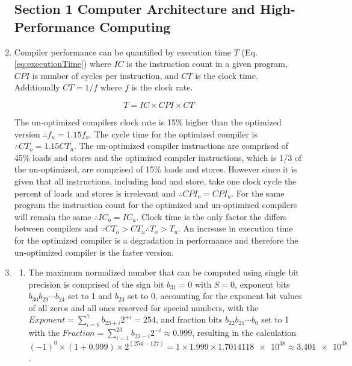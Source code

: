 \documentclass[main.tex]{subfiles}
\begin{document}
\begin{enumerate}

\subsection{Section 1 Computer Architecture and High-Performance Computing}

\item Compiler performance can be quantified by execution time $T$ (Eq. \ref{eq:executionTime}) where $IC$ is the instruction count in a given program, $CPI$ is number of cycles per instruction, and $CT$ is the clock time. Additionally $CT=1/f$ where $f$ is the clock rate.

\begin{equation} \label{eq:executionTime}
T = IC \times CPI \times CT
\end{equation}

The un-optimized compilers clock rate is 15\% higher than the optimized version $\therefore f_{u} = 1.15f_{o}$. The cycle time for the optimized compiler is $\therefore CT_o = 1.15CT_u$. The un-optimized compiler instructions are comprised of 45\% loads and stores and the optimized compiler instructions, which is 1/3 of the un-optimized, are comprised of 15\% loads and stores. However since it is given that all instructions, including load and store, take one clock cycle the percent of loads and stores is irrelevant and $\therefore CPI_o = CPI_u$. For the same program the instruction count for the optimized and un-optimized compilers will remain the same $\therefore IC_o = IC_u$. Clock time is the only factor the differs between compilers and $\because CT_o > CT_u \therefore T_o > T_u$. An increase in execution time for the optimized compiler is a degradation in performance and therefore the un-optimized compiler is the faster version.

\item 
\begin{enumerate}
    \item The maximum normalized number that can be computed using single bit precision is comprised of the sign bit $b_{31} = 0$ with $S=0$, exponent bits $b_{30} b_{29} \cdots b_{24}$ set to 1 and $b_{23}$ set to 0, accounting for the exponent bit values of all zeros and all ones reserved for special numbers, with the $Exponent = \sum_{i=0}^{7} b_{23+i} 2^{+i} = 254$, and fraction bits $b_{22} b_{21} \cdots b_{0}$ set to 1 with the $Fraction = \sum_{i=1}^{23} b_{23-i} 2^{-i} \approx 0.999$, resulting in the calculation $(-1)^0 \times (1+0.999) \times 2^{(254-127)} = 1 \times 1.999 \times \num{1.7014118e38} \approx \num{3.401e38}$. 
    

\end{enumerate}
\end{enumerate}
\end{document}
